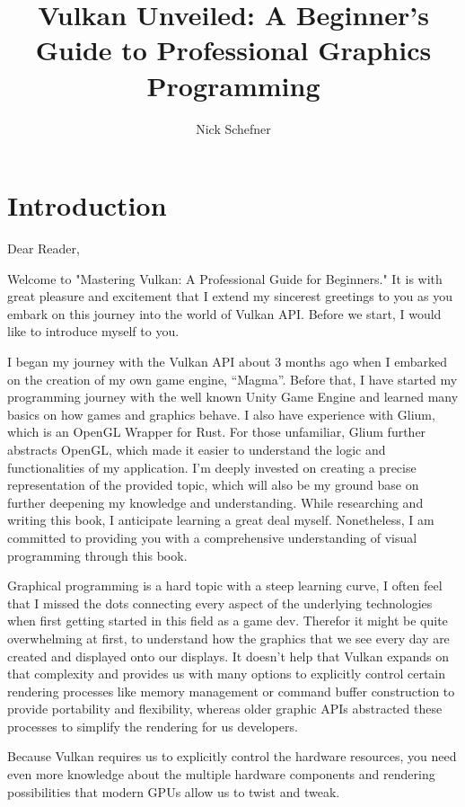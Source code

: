 \documentclass[12pt]{report} \usepackage {preamble}
\title {\textbf{\huge Vulkan Unveiled: A Beginner's Guide to Professional
		Graphics Programming}} \author {Nick Schefner}
\begin{document}
 \maketitle

\tableofcontents

\chapter {Introduction}

Dear Reader,

Welcome to "Mastering Vulkan: A Professional Guide for Beginners."  It is
with great pleasure and excitement that I extend my sincerest greetings
to you as you embark on this journey into the world of Vulkan API.
Before we start, I would like to introduce myself to you.

I began my journey with the Vulkan API about 3 months ago when I embarked
on the creation of my own game engine, “Magma”.  Before that, I have
started my programming journey with the well known Unity Game Engine
and learned many basics on how games and graphics behave. I also have
experience with Glium, which is an OpenGL Wrapper for Rust. For those
unfamiliar, Glium further abstracts OpenGL, which made it easier to
understand the logic and functionalities of my application.  I’m deeply
invested on creating a precise representation of the provided topic,
which will also be my ground base on further deepening my knowledge and
understanding.	While researching and writing this book, I anticipate
learning a great deal myself.  Nonetheless, I am committed to providing
you with a comprehensive understanding of visual programming through
this book.

Graphical programming is a hard topic with a steep learning curve,
I often feel that I missed the dots connecting every aspect of the
underlying technologies when first getting started in this field as a
game dev. Therefor it might be quite overwhelming at first, to understand
how the graphics that we see every day are created and displayed onto
our displays. It doesn’t help that Vulkan expands on that complexity
and provides us with many options to explicitly control certain rendering
processes like memory management or command buffer construction to provide
portability and flexibility, whereas older graphic APIs abstracted these
processes to simplify the rendering for us developers.

Because Vulkan requires us to explicitly control the hardware resources,
you need even more knowledge about the multiple hardware components and
rendering possibilities that modern GPUs allow us to twist and tweak.
\end{document}
